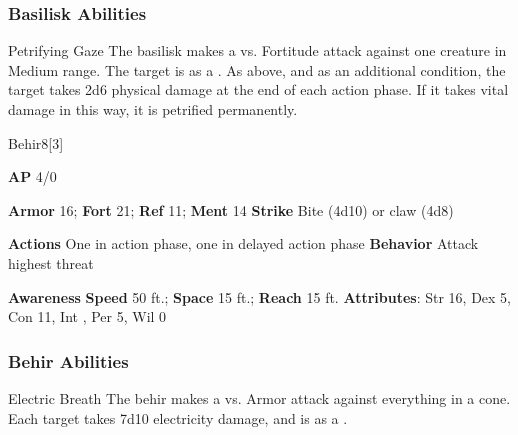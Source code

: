 \subsubsection{Basilisk Abilities}

\begin{freeability}{Petrifying Gaze}
The basilisk makes a  vs. Fortitude attack against one creature in Medium range.
\hit The target is  as a .
\crit As above, and as an additional condition, the target takes 2d6 physical damage at the end of each action phase.
If it takes vital damage in this way, it is petrified permanently.
\end{freeability}

\begin{monsection}{Behir}{8}[3]
\vspace{-1em}\vspace{-1em}
\begin{spellcontent}
\begin{spelltargetinginfo}
{\textbf{AP} 4/0}

\pari \textbf{Armor} 16;
\textbf{Fort} 21;
\textbf{Ref} 11;
\textbf{Ment} 14
\pari \textbf{Strike} Bite  (4d10) or claw  (4d8)


\pari \textbf{Actions} One in action phase, one in delayed action phase
\pari \textbf{Behavior} Attack highest threat
\end{spelltargetinginfo}
\end{spellcontent}

\begin{monsterfooter}
\pari \textbf{Awareness} 
\pari \textbf{Speed} 50 ft.;
\textbf{Space} 15 ft.;
\textbf{Reach} 15 ft.
\pari \textbf{Attributes}:
Str 16,
Dex 5,
Con 11,
Int ,
Per 5,
Wil 0
\end{monsterfooter}
\end{monsection}


\subsubsection{Behir Abilities}

\begin{freeability}{Electric Breath}
The behir makes a  vs. Armor attack against everything in a \areamed cone.
\hit Each target takes 7d10 electricity damage, and is  as a .
\end{freeability}

